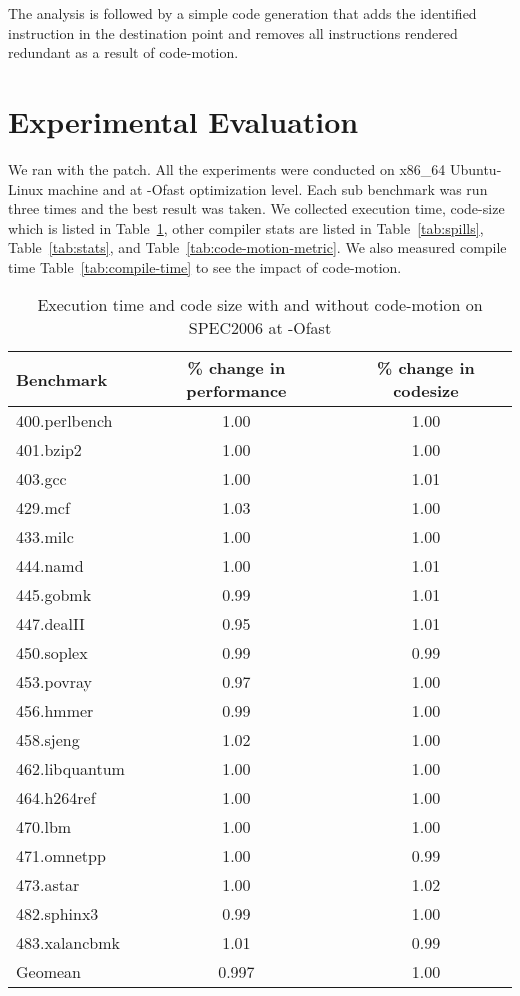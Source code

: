 \documentclass[acmlarge,review,anonymous]{acmart}\settopmatter{printfolios=true}
\begin{document}
The analysis is followed by a simple code generation that adds the identified
instruction in the destination point and removes all instructions rendered
redundant as a result of code-motion.


\section{Experimental Evaluation}
\label{sec:experimental-results}
We ran \SPEC{} with the patch. All the experiments were conducted on x86\_64
Ubuntu-Linux machine and at -Ofast optimization level. Each sub benchmark was
run three times and the best result was taken. We collected execution time,
code-size which is listed in Table~\ref{tab:code-size}, other compiler stats are
listed in Table~\ref{tab:spills}, Table~\ref{tab:stats}, and
Table~\ref{tab:code-motion-metric}.  We also measured compile time
Table~\ref{tab:compile-time} to see the impact of code-motion.

\begin{table}[h!]
  \begin{center}
    \begin{tabular}{|l|c|c|}
      \hline
Benchmark       &\% change in performance & \% change in codesize \\\hline
400.perlbench	& 1.00  & 1.00 \\\hline
401.bzip2	& 1.00  & 1.00 \\\hline
403.gcc	        & 1.00  & 1.01 \\\hline
429.mcf	        & 1.03  & 1.00 \\\hline
433.milc	& 1.00  & 1.00 \\\hline
444.namd	& 1.00  & 1.01 \\\hline
445.gobmk	& 0.99  & 1.01 \\\hline
447.dealII	& 0.95  & 1.01 \\\hline
450.soplex	& 0.99  & 0.99 \\\hline
453.povray	& 0.97  & 1.00 \\\hline
456.hmmer	& 0.99  & 1.00 \\\hline
458.sjeng	& 1.02  & 1.00 \\\hline
462.libquantum	& 1.00  & 1.00 \\\hline
464.h264ref	& 1.00  & 1.00 \\\hline
470.lbm	        & 1.00  & 1.00 \\\hline
471.omnetpp	& 1.00  & 0.99 \\\hline
473.astar	& 1.00  & 1.02 \\\hline
482.sphinx3	& 0.99  & 1.00 \\\hline
483.xalancbmk	& 1.01  & 0.99 \\\hline
Geomean         & 0.997 & 1.00 \\\hline
    \end{tabular}
  \end{center}
  \caption{Execution time and code size with and without code-motion on SPEC2006 at -Ofast}
  \label{tab:code-size}
\end{table}
\end{document}
